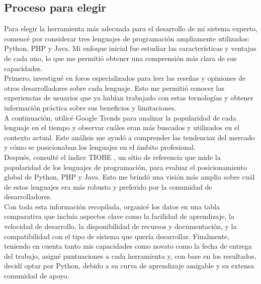 \subsection{Proceso para elegir}
Para elegir la herramienta más adecuada para el desarrollo de mi sistema experto, comencé por considerar tres lenguajes de programación ampliamente utilizados: Python, PHP y Java. Mi enfoque inicial fue estudiar las características y ventajas de cada uno, lo que me permitió obtener una comprensión más clara de sus capacidades. \\
Primero, investigué en foros especializados para leer las reseñas y opiniones de otros desarrolladores sobre cada lenguaje. Esto me permitió conocer las experiencias de usuarios que ya habían trabajado con estas tecnologías y obtener información práctica sobre sus beneficios y limitaciones. \\
A continuación, utilicé Google Trends \cite{go} para analizar la popularidad de cada lenguaje en el tiempo y observar cuáles eran más buscados y utilizados en el contexto actual. Este análisis me ayudó a comprender las tendencias del mercado y cómo se posicionaban los lenguajes en el ámbito profesional. \\
Después, consulté el índice TIOBE \cite{to}, un sitio de referencia que mide la popularidad de los lenguajes de programación, para evaluar el posicionamiento global de Python, PHP y Java. Esto me brindó una visión más amplia sobre cuál de estos lenguajes era más robusto y preferido por la comunidad de desarrolladores. \\
Con toda esta información recopilada, organicé los datos en una tabla comparativa que incluía aspectos clave como la facilidad de aprendizaje, la velocidad de desarrollo, la disponibilidad de recursos y documentación, y la compatibilidad con el tipo de sistema que quería desarrollar. Finalmente, teniendo en cuenta tanto mis capacidades como novato como la fecha de entrega del trabajo, asigné puntuaciones a cada herramienta y, con base en los resultados, decidí optar por Python, debido a su curva de aprendizaje amigable y su extensa comunidad de apoyo. \\

